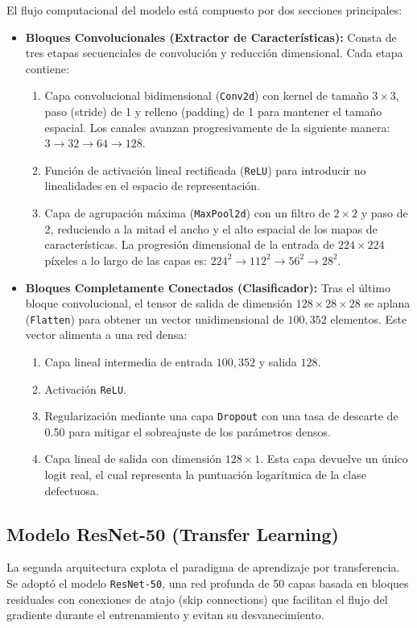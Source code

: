 \documentclass{article}
\begin{document}
El flujo computacional del modelo está compuesto por dos secciones principales:
\begin{itemize}
    \item \textbf{Bloques Convolucionales (Extractor de Características):} Consta de tres etapas secuenciales de convolución y reducción dimensional. Cada etapa contiene:
    \begin{enumerate}
        \item Capa convolucional bidimensional (\texttt{Conv2d}) con kernel de tamaño $3 \times 3$, paso (stride) de 1 y relleno (padding) de 1 para mantener el tamaño espacial. Los canales avanzan progresivamente de la siguiente manera: $3 \to 32 \to 64 \to 128$.
        \item Función de activación lineal rectificada (\texttt{ReLU}) para introducir no linealidades en el espacio de representación.
        \item Capa de agrupación máxima (\texttt{MaxPool2d}) con un filtro de $2 \times 2$ y paso de 2, reduciendo a la mitad el ancho y el alto espacial de los mapas de características. La progresión dimensional de la entrada de $224 \times 224$ píxeles a lo largo de las capas es: $224^2 \to 112^2 \to 56^2 \to 28^2$.
    \end{enumerate}
    \item \textbf{Bloques Completamente Conectados (Clasificador):} Tras el último bloque convolucional, el tensor de salida de dimensión $128 \times 28 \times 28$ se aplana (\texttt{Flatten}) para obtener un vector unidimensional de $100,352$ elementos. Este vector alimenta a una red densa:
    \begin{enumerate}
        \item Capa lineal intermedia de entrada $100,352$ y salida $128$.
        \item Activación \texttt{ReLU}.
        \item Regularización mediante una capa \texttt{Dropout} con una tasa de descarte de 0.50 para mitigar el sobreajuste de los parámetros densos.
        \item Capa lineal de salida con dimensión $128 \times 1$. Esta capa devuelve un único logit real, el cual representa la puntuación logarítmica de la clase defectuosa.
    \end{enumerate}
\end{itemize}

\subsection{Modelo ResNet-50 (Transfer Learning)}
La segunda arquitectura explota el paradigma de aprendizaje por transferencia. Se adoptó el modelo \texttt{ResNet-50}, una red profunda de 50 capas basada en bloques residuales con conexiones de atajo (skip connections) que facilitan el flujo del gradiente durante el entrenamiento y evitan su desvanecimiento.
\end{document}
